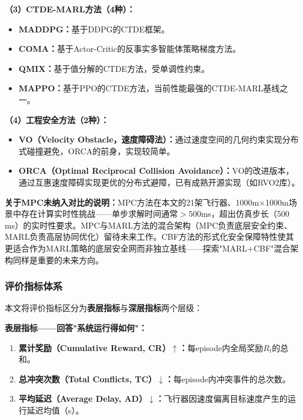 \documentclass[12pt,a4paper,UTF8]{ctexart}
\begin{document}
\textbf{（3）CTDE-MARL方法（4种）：}
\begin{itemize}
    \item \textbf{MADDPG：}基于DDPG的CTDE框架。
    \item \textbf{COMA：}基于Actor-Critic的反事实多智能体策略梯度方法。
    \item \textbf{QMIX：}基于值分解的CTDE方法，受单调性约束。
    \item \textbf{MAPPO：}基于PPO的CTDE方法，当前性能最强的CTDE-MARL基线之一。
\end{itemize}

\textbf{（4）工程安全方法（2种）：}
\begin{itemize}
    \item \textbf{VO（Velocity Obstacle，速度障碍法）：}通过速度空间的几何约束实现分布式碰撞避免，ORCA的前身，实现较简单。
    \item \textbf{ORCA（Optimal Reciprocal Collision Avoidance）：}VO的改进版本，通过互惠速度障碍实现更优的分布式避障，已有成熟开源实现（如RVO2库）。
\end{itemize}

\textbf{关于MPC未纳入对比的说明：}MPC方法在本文的21架飞行器、1000m$\times$1000m场景中存在计算实时性挑战——单步求解时间通常$>500$ms，超出仿真步长（500 ms）的实时性要求。MPC与MARL方法的混合架构（MPC负责底层安全约束、MARL负责高层协同优化）留待未来工作。CBF方法的形式化安全保障特性使其更适合作为MARL策略的底层安全网而非独立基线——探索"MARL$+$CBF"混合架构同样是重要的未来方向。

\subsubsection{评价指标体系}

本文将评价指标区分为\textbf{表层指标}与\textbf{深层指标}两个层级：

\textbf{表层指标——回答"系统运行得如何"：}
\begin{enumerate}[label=(\arabic*)]
    \item \textbf{累计奖励（Cumulative Reward, CR）$\uparrow$：}每episode内全局奖励$R_t$的总和。
    \item \textbf{总冲突次数（Total Conflicts, TC）$\downarrow$：}每episode内冲突事件的总次数。
    \item \textbf{平均延迟（Average Delay, AD）$\downarrow$：}飞行器因速度偏离目标速度产生的运行延迟均值（s）。
\end{enumerate}
\end{document}
